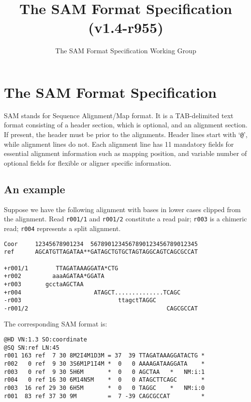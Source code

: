 \documentclass[10pt]{article}
\title{The SAM Format Specification (v1.4-r955)}
\author{The SAM Format Specification Working Group}
\begin{document}
\maketitle


\section{The SAM Format Specification}
SAM stands for Sequence Alignment/Map format. It is a TAB-delimited text
format consisting of a header section, which is optional, and an
alignment section. If present, the header must be prior to the
alignments. Header lines start with `{\tt @}', while alignment lines do
not. Each alignment line has 11 mandatory fields for essential alignment
information such as mapping position, and variable number of optional
fields for flexible or aligner specific information.

\subsection{An example}
Suppose we have the following alignment with bases in lower cases
clipped from the alignment. Read {\tt r001/1} and {\tt r001/2}
constitute a read pair; {\tt r003} is a chimeric read; {\tt r004}
represents a split alignment.

\begin{framed}\small
\begin{verbatim}
Coor     12345678901234  5678901234567890123456789012345
ref      AGCATGTTAGATAA**GATAGCTGTGCTAGTAGGCAGTCAGCGCCAT

+r001/1        TTAGATAAAGGATA*CTG
+r002         aaaAGATAA*GGATA
+r003       gcctaAGCTAA
+r004                     ATAGCT..............TCAGC
-r003                            ttagctTAGGC
-r001/2                                        CAGCGCCAT
\end{verbatim}
\end{framed}
The corresponding SAM format is:
\begin{framed}\small
\begin{verbatim}
@HD VN:1.3 SO:coordinate
@SQ SN:ref LN:45
r001 163 ref  7 30 8M2I4M1D3M = 37  39 TTAGATAAAGGATACTG *
r002   0 ref  9 30 3S6M1P1I4M *  0   0 AAAAGATAAGGATA    *
r003   0 ref  9 30 5H6M       *  0   0 AGCTAA   *   NM:i:1
r004   0 ref 16 30 6M14N5M    *  0   0 ATAGCTTCAGC       *
r003  16 ref 29 30 6H5M       *  0   0 TAGGC    *   NM:i:0
r001  83 ref 37 30 9M         =  7 -39 CAGCGCCAT         *
\end{verbatim}
\end{framed}
\end{document}
